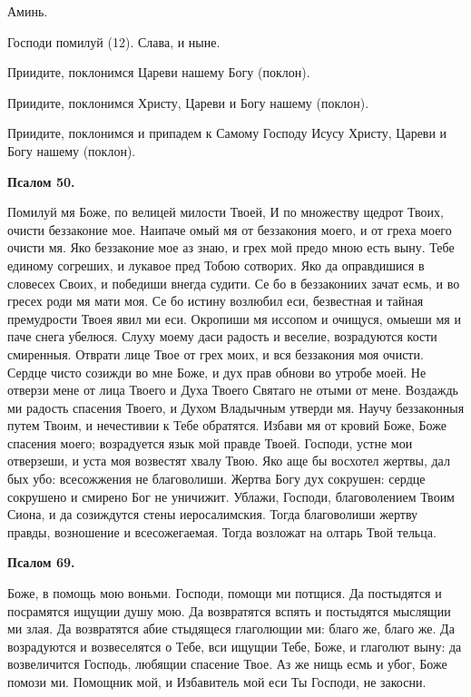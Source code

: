 Аминь.

Господи помилуй (12). Слава, и ныне.

Приидите, поклонимся Цареви нашему Богу (поклон).

Приидите, поклонимся Христу, Цареви и Богу нашему (поклон).

Приидите, поклонимся и припадем к Самому Господу Исусу Христу, Цареви и Богу нашему (поклон).


\medskip


\bfseries Псалом 50.\normalfont{}


Помилуй мя Боже, по велицей милости Твоей, И по множеству щедрот Твоих, очисти беззаконие мое. Наипаче омый мя от беззакония моего, и от греха моего очисти мя. Яко беззаконие мое аз знаю, и грех мой предо мною есть выну. Тебе единому согреших, и лукавое пред Тобою сотворих. Яко да оправдишися в словесех Своих, и победиши внегда судити. Се бо в беззакониих зачат есмь, и во гресех роди мя мати моя. Се бо истину возлюбил еси, безвестная и тайная премудрости Твоея явил ми еси. Окропиши мя иссопом и очищуся, омыеши мя и паче снега убелюся. Слуху моему даси радость и веселие, возрадуются кости смиренныя. Отврати лице Твое от грех моих, и вся беззакония моя очисти. Сердце чисто созижди во мне Боже, и дух прав обнови во утробе моей. Не отверзи мене от лица Твоего и Духа Твоего Святаго не отыми от мене. Воздаждь ми радость спасения Твоего, и Духом Владычным утверди мя. Научу беззаконныя путем Твоим, и нечестивии к Тебе обратятся. Избави мя от кровий Боже, Боже спасения моего; возрадуется язык мой правде Твоей. Господи, устне мои отверзеши, и уста моя возвестят хвалу Твою. Яко аще бы восхотел жертвы, дал бых убо: всесожжения не благоволиши. Жертва Богу дух сокрушен: сердце сокрушено и смирено Бог не уничижит. Ублажи, Господи, благоволением Твоим Сиона, и да созиждутся стены иеросалимския. Тогда благоволиши жертву правды, возношение и всесожегаемая. Тогда возложат на олтарь Твой тельца.


\medskip


\bfseries Псалом 69.\normalfont{}


Боже, в помощь мою воньми. Господи, помощи ми потщися. Да постыдятся и посрамятся ищущии душу мою. Да возвратятся вспять и постыдятся мыслящии ми злая. Да возвратятся абие стыдящеся глаголющии ми: благо же, благо же. Да возрадуются и возвеселятся о Тебе, вси ищущии Тебе, Боже, и глаголют выну: да возвеличится Господь, любящии спасение Твое. Аз же нищь есмь и убог, Боже помози ми. Помощник мой, и Избавитель мой еси Ты  Господи, не закосни.


